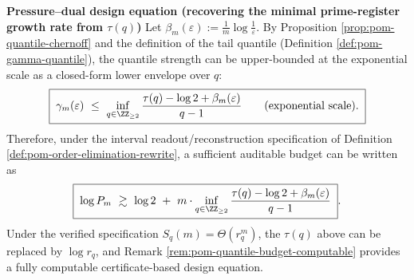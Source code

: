 \medskip\noindent\textbf{Pressure--dual design equation (recovering the minimal prime-register growth rate from \(\tau(q)\))}
Let \(\beta_m(\varepsilon):=\frac{1}{m}\log\frac{1}{\varepsilon}\).
By Proposition \ref{prop:pom-quantile-chernoff} and the definition of the tail quantile (Definition \ref{def:pom-gamma-quantile}), the quantile strength can be upper-bounded at the exponential scale as a closed-form lower envelope over \(q\):
\[
\boxed{\;
\gamma_m(\varepsilon)\ \le\
\inf_{q\in\ZZ_{\ge 2}}
\frac{\tau(q)-\log 2+\beta_m(\varepsilon)}{q-1}
\qquad(\text{exponential scale}).\;}
\]
Therefore, under the interval readout/reconstruction specification of Definition \ref{def:pom-order-elimination-rewrite}, a sufficient auditable budget can be written as
\[
\boxed{\;
\log P_m\ \gtrsim\ \log 2\ +\ m\cdot
\inf_{q\in\ZZ_{\ge 2}}
\frac{\tau(q)-\log 2+\beta_m(\varepsilon)}{q-1}\; }.
\]
Under the verified specification \(S_q(m)=\Theta(r_q^m)\), the \(\tau(q)\) above can be replaced by \(\log r_q\), and Remark \ref{rem:pom-quantile-budget-computable} provides a fully computable certificate-based design equation.

